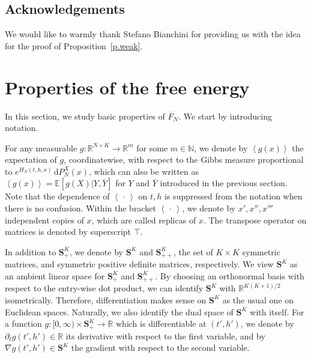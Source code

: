 \documentclass[AHL,Unicode,longabstracts,published]{cedram}
\newcommand{\N}{\mathbb{N}}
\newcommand{\R}{\mathbb{R}}
\newcommand{\E}{\mathbb{E}}
\renewcommand{\S}{\mathbf{S}}
\renewcommand{\d}{\mathrm{d}}
\renewcommand{\bar}{\overline}
\newcommand{\la}{\left\langle}
\newcommand{\ra}{\right\rangle}
\begin{document}
\subsection*{Acknowledgements}
We would like to warmly thank Stefano Bianchini for providing us with the idea for the proof of Proposition~\ref{p.weak}.

\section{Properties of the free energy}\label{s.prop.F_N}

In this section, we study basic properties of $\bar F_N$. We start by introducing notation.

For any measurable $g:\R^{N\times K}\to \R^m$ {for some $m\in\N$}, we denote by $\la g(x)\ra$ the expectation of $g${, coordinatewise, } with respect to the Gibbs measure proportional to $e^{H_N(t,h,x)} \, \d P^X_N(x)$, which can also be written as $\la g(x)\ra = \E [g(X)|Y,\bar Y]$ for $Y$ and $\bar Y$ introduced in the previous section. Note that the dependence of $\la\, \cdot \,\ra$ on $t,h$ is suppressed from the notation when there is no confusion. Within the bracket $\la\, \cdot \,\ra$, we denote by $x',x'',x'''$ independent copies of $x$, which are called replicas of $x$. The transpose operator on matrices is denoted by superscript $\intercal$.


In addition to $\S^K_+$, we denote by $\S^K$ and $\S^K_{++}$, the set of $K\times K$ symmetric matrices, and symmetric positive definite matrices, respectively. We view $\S^K$ as an ambient linear space for $\S^K_+$ and $\S^K_{++}$. By choosing an orthonormal basis with respect to the entry-wise dot product, we can identify $\S^K$ with $\R^{K(K+1)/2}$ isometrically. Therefore, differentiation makes sense on $\S^K$ as the usual one on Euclidean spaces. Naturally, we also identify the dual space of $\S^K$ with itself. For a function $g:[0,\infty)\times \S^K_+\to\R$ which is differentiable at $(t',h')$, we denote by $\partial_t g(t',h')\in\R$ its derivative with respect to the first variable, and by $\nabla g(t',h')\in\S^K$ the gradient with respect to the second variable.
\end{document}

